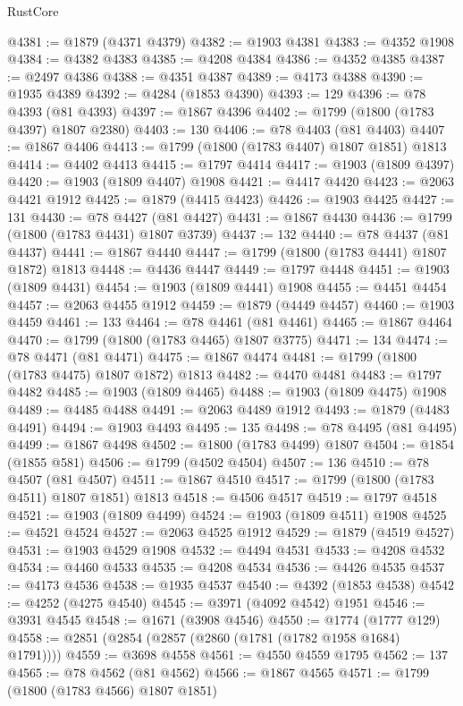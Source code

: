 \begin{lexlean}{RustCore}
\begin{coremodule}
@4381 := @1879 (@4371 @4379)
@4382 := @1903 @4381
@4383 := @4352 @1908
@4384 := @4382 @4383
@4385 := @4208 @4384
@4386 := @4352 @4385
@4387 := @2497 @4386
@4388 := @4351 @4387
@4389 := @4173 @4388
@4390 := @1935 @4389
@4392 := @4284 (@1853 @4390)
@4393 := 129
@4396 := @78 @4393 (@81 @4393)
@4397 := @1867 @4396
@4402 := @1799 (@1800 (@1783 @4397) @1807 @2380)
@4403 := 130
@4406 := @78 @4403 (@81 @4403)
@4407 := @1867 @4406
@4413 := @1799 (@1800 (@1783 @4407) @1807 @1851) @1813
@4414 := @4402 @4413
@4415 := @1797 @4414
@4417 := @1903 (@1809 @4397)
@4420 := @1903 (@1809 @4407) @1908
@4421 := @4417 @4420
@4423 := @2063 @4421 @1912
@4425 := @1879 (@4415 @4423)
@4426 := @1903 @4425
@4427 := 131
@4430 := @78 @4427 (@81 @4427)
@4431 := @1867 @4430
@4436 := @1799 (@1800 (@1783 @4431) @1807 @3739)
@4437 := 132
@4440 := @78 @4437 (@81 @4437)
@4441 := @1867 @4440
@4447 := @1799 (@1800 (@1783 @4441) @1807 @1872) @1813
@4448 := @4436 @4447
@4449 := @1797 @4448
@4451 := @1903 (@1809 @4431)
@4454 := @1903 (@1809 @4441) @1908
@4455 := @4451 @4454
@4457 := @2063 @4455 @1912
@4459 := @1879 (@4449 @4457)
@4460 := @1903 @4459
@4461 := 133
@4464 := @78 @4461 (@81 @4461)
@4465 := @1867 @4464
@4470 := @1799 (@1800 (@1783 @4465) @1807 @3775)
@4471 := 134
@4474 := @78 @4471 (@81 @4471)
@4475 := @1867 @4474
@4481 := @1799 (@1800 (@1783 @4475) @1807 @1872) @1813
@4482 := @4470 @4481
@4483 := @1797 @4482
@4485 := @1903 (@1809 @4465)
@4488 := @1903 (@1809 @4475) @1908
@4489 := @4485 @4488
@4491 := @2063 @4489 @1912
@4493 := @1879 (@4483 @4491)
@4494 := @1903 @4493
@4495 := 135
@4498 := @78 @4495 (@81 @4495)
@4499 := @1867 @4498
@4502 := @1800 (@1783 @4499) @1807
@4504 := @1854 (@1855 @581)
@4506 := @1799 (@4502 @4504)
@4507 := 136
@4510 := @78 @4507 (@81 @4507)
@4511 := @1867 @4510
@4517 := @1799 (@1800 (@1783 @4511) @1807 @1851) @1813
@4518 := @4506 @4517
@4519 := @1797 @4518
@4521 := @1903 (@1809 @4499)
@4524 := @1903 (@1809 @4511) @1908
@4525 := @4521 @4524
@4527 := @2063 @4525 @1912
@4529 := @1879 (@4519 @4527)
@4531 := @1903 @4529 @1908
@4532 := @4494 @4531
@4533 := @4208 @4532
@4534 := @4460 @4533
@4535 := @4208 @4534
@4536 := @4426 @4535
@4537 := @4173 @4536
@4538 := @1935 @4537
@4540 := @4392 (@1853 @4538)
@4542 := @4252 (@4275 @4540)
@4545 := @3971 (@4092 @4542) @1951
@4546 := @3931 @4545
@4548 := @1671 (@3908 @4546)
@4550 := @1774 (@1777 @129)
@4558 := @2851 (@2854 (@2857 (@2860 (@1781 (@1782 @1958 @1684) @1791))))
@4559 := @3698 @4558
@4561 := @4550 @4559 @1795
@4562 := 137
@4565 := @78 @4562 (@81 @4562)
@4566 := @1867 @4565
@4571 := @1799 (@1800 (@1783 @4566) @1807 @1851)

\end{coremodule}
\end{lexlean}
